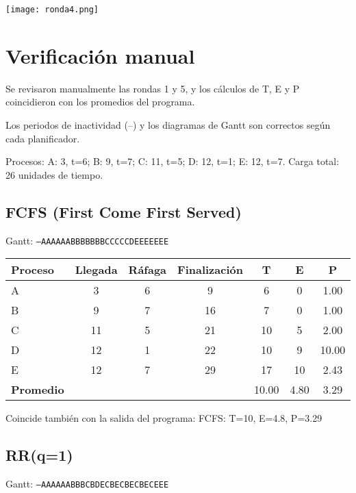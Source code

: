 \documentclass[12pt]{article}
\begin{document}
\begin{center}
    \texttt{[image: ronda4.png]}
\end{center}


\section*{Verificación manual}

Se revisaron manualmente las rondas 1 y 5, y los cálculos de T, E y P coincidieron con los promedios del programa.  

Los periodos de inactividad (–) y los diagramas de Gantt son correctos según cada planificador.

Procesos: A: 3, t=6; B: 9, t=7; C: 11, t=5; D: 12, t=1; E: 12, t=7.  
Carga total: 26 unidades de tiempo.  

\subsection*{FCFS (First Come First Served)}

Gantt: \texttt{---AAAAAABBBBBBBCCCCCDEEEEEEE}

\begin{center}
\begin{tabular}{lcccccc}
\toprule
\textbf{Proceso} & \textbf{Llegada} & \textbf{Ráfaga} & \textbf{Finalización} & \textbf{T} & \textbf{E} & \textbf{P} \\
\midrule
A & 3 & 6 & 9 & 6 & 0 & 1.00 \\
B & 9 & 7 & 16 & 7 & 0 & 1.00 \\
C & 11 & 5 & 21 & 10 & 5 & 2.00 \\
D & 12 & 1 & 22 & 10 & 9 & 10.00 \\
E & 12 & 7 & 29 & 17 & 10 & 2.43 \\
\midrule
\textbf{Promedio} & & & & 10.00 & 4.80 & 3.29 \\
\bottomrule
\end{tabular}
\end{center}

Coincide también con la salida del programa: FCFS: T=10, E=4.8, P=3.29

\subsection*{RR(q=1)}

Gantt: \texttt{---AAAAAABBBCBDECBECBECBECEEE}
\end{document}
